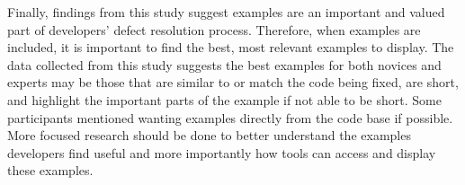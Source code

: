 Finally, findings from this study suggest examples are an important and valued part of developers' defect resolution process. 
Therefore, when examples are included, it is important to find the best, most relevant examples to display. 
The data collected from this study suggests the best examples for both novices and experts may be those that are similar to or match the code being fixed, are short, and highlight the important parts of the example if not able to be short.
Some participants mentioned wanting examples directly from the code base if possible.
More focused research should be done to better understand the examples developers find useful and more importantly how tools can access and display these examples.
